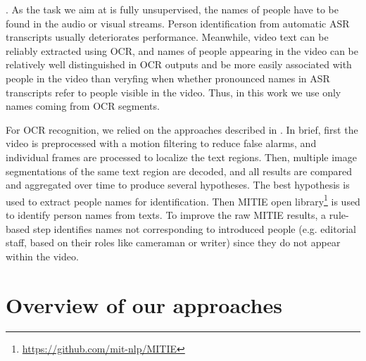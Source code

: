 . As the task we aim at is fully unsupervised, 
the names of people have to be found in the audio  or visual streams.
%
%
Person identification from automatic ASR transcripts usually deteriorates performance. 
Meanwhile, video text can be reliably extracted using OCR, and names of people appearing in the video 
can be relatively well distinguished in OCR outputs and 
be more easily  associated with people in the video than 
veryfing when whether pronounced names in ASR transcripts refer to people visible in the video. 
Thus, in this work we use only names coming from OCR segments.

For  OCR recognition, we relied on the approaches described in \cite{chen-pr04}.
%
In brief, first the video is preprocessed with a motion filtering to reduce false alarms, 
and individual frames are processed to localize the text regions.
%
%
Then, multiple image segmentations of the same text region are decoded, and all results are compared and 
aggregated over time to produce several hypotheses. 
%
The best hypothesis is used to extract people names for identification. Then MITIE open library\footnote{\url{https://github.com/mit-nlp/MITIE}} is used to identify person names from texts. 
%
%
To improve the raw MITIE results, a rule-based step identifies names not corresponding to introduced people (e.g. editorial staff,  
based on their roles like  cameraman or writer) since they  do not appear within the video.





\section{Overview of our approaches}
\label{sec:overview}


